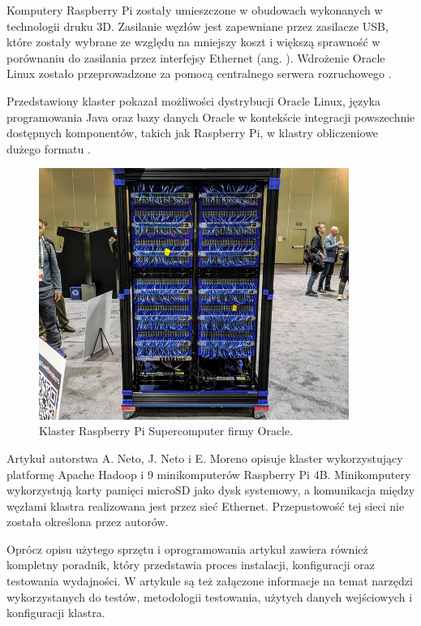 Komputery Raspberry Pi zostały umieszczone w obudowach wykonanych w technologii druku 3D.
Zasilanie węzłów jest zapewniane przez zasilacze USB, które zostały wybrane ze względu na
mniejszy koszt i większą sprawność w porównaniu do zasilania przez interfejsy Ethernet
(ang. ). Wdrożenie Oracle Linux zostało przeprowadzone
za pomocą centralnego serwera rozruchowego \cite{oracle-cluster-1}.

Przedstawiony klaster pokazał możliwości dystrybucji Oracle Linux, języka programowania Java
oraz bazy danych Oracle w kontekście integracji powszechnie dostępnych komponentów, takich jak
Raspberry Pi, w klastry obliczeniowe dużego formatu \cite{oracle-cluster-2}.

\begin{figure}[h]
      \centering
      \includegraphics[width=0.9\textwidth]{graf/Oracle.jpg}
      \caption {Klaster Raspberry Pi Supercomputer firmy Oracle. \cite{oracle-cluster-1}}
      \label{fig:oracle-cluster}
\end{figure}

Artykuł autorstwa A. Neto, J. Neto i E. Moreno \cite{rpi-cluster-1} opisuje klaster
 wykorzystujący platformę Apache Hadoop i 9 minikomputerów Raspberry Pi 4B.
Minikomputery wykorzystują karty pamięci microSD jako dysk systemowy, a komunikacja
między węzłami klastra realizowana jest przez sieć Ethernet. Przepustowość tej sieci
nie została określona przez autorów.
\newpage

Oprócz opisu użytego sprzętu i oprogramowania artykuł zawiera również kompletny poradnik,
który przedstawia proces instalacji, konfiguracji oraz testowania wydajności. W artykule
są też załączone informacje na temat narzędzi wykorzystanych do testów, metodologii
testowania, użytych danych wejściowych i konfiguracji klastra.

